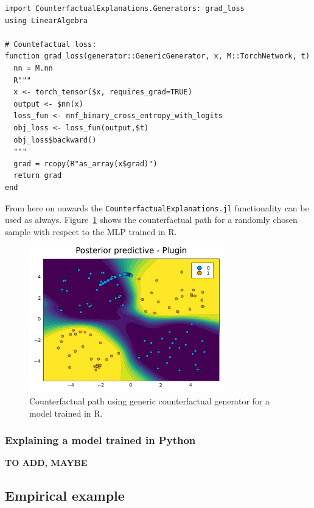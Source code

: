 \documentclass{juliacon}
\begin{document}
\begin{lstlisting}
import CounterfactualExplanations.Generators: grad_loss
using LinearAlgebra

# Countefactual loss:
function grad_loss(generator::GenericGenerator, x, M::TorchNetwork, t) 
  nn = M.nn
  R"""
  x <- torch_tensor($x, requires_grad=TRUE)
  output <- $nn(x)
  loss_fun <- nnf_binary_cross_entropy_with_logits
  obj_loss <- loss_fun(output,$t)
  obj_loss$backward()
  """
  grad = rcopy(R"as_array(x$grad)")
  return grad
end
\end{lstlisting}

From here on onwards the \texttt{CounterfactualExplanations.jl}
functionality can be used as always. Figure~\ref{fig-torch} shows the
counterfactual path for a randomly chosen sample with respect to the MLP
trained in R.

\begin{figure}

{\centering \includegraphics[width=3.33333in,height=2.5in]{www/ce_torch.png}

}

\caption{\label{fig-torch}Counterfactual path using generic
counterfactual generator for a model trained in R.}

\end{figure}

\hypertarget{explaining-a-model-trained-in-python}{%
\subsubsection{Explaining a model trained in
Python}\label{explaining-a-model-trained-in-python}}

\textbf{TO ADD, MAYBE}

\hypertarget{sec-emp}{%
\subsection{Empirical example}\label{sec-emp}}
\end{document}
